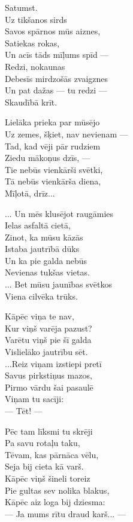 \documentclass[14pt]{extarticle}
\begin{document}
{{Satumst.\\
Uz tikšanos sirds\\
Savos spārnos mūs aiznes,\\
Satiekas rokas,\\
Un acīs tāds mīļums spīd ---\\
Redzi, nokaunas\\
Debesīs mirdzošās zvaigznes\\
Un pat dažas --- tu redzi ---\\
Skaudībā krīt. 

Lielāka prieka par mūsējo\\
Uz zemes, šķiet, nav nevienam ---\\
Tad, kad vēji pār rudziem\\
Ziedu mākoņus dzīs, ---\\
Tie nebūs vienkārši svētki,\\
Tā nebūs vienkārša diena,\\
Mīļotā, drīz...

... Un mēs klusējot raugāmies\\
Ielas asfaltā cietā,\\
Zinot, ka mūsu kāzās\\
Istaba jautrībā dūks\\
Un ka pie  galda nebūs\\
Nevienas tukšas vietas.\\
... Bet mūsu jaunības svētkos\\
Viena cilvēka trūks.

Kāpēc viņa te nav,\\
Kur viņš varēja pazust?\\
Varētu viņš pie šī galda\\
Vislielāko jautrību sēt.\\
...Reiz viņam izstiepi pretī\\
Savus pirkstiņus mazos,\\
Pirmo vārdu šai pasaulē\\
Viņam tu sacīji:\\
--- Tēt! ---

Pēc tam līksmi tu skrēji\\
Pa savu rotaļu taku,\\
Tēvam, kas pārnāca vēlu,\\
Seja bij cieta kā varš.\\
Kāpēc viņš šineli toreiz\\
Pie gultas sev nolika blakus,\\
Kāpēc aiz loga bij dziesma:\\
--- Ja mums rītu draud karš... ---



}}
\end{document}
